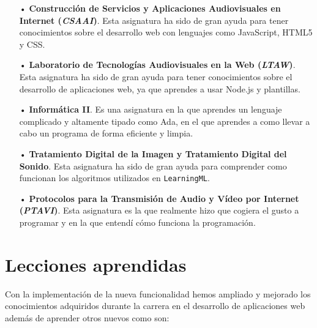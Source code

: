 \documentclass[a4paper, 12pt]{book}
\begin{document}
\begin{enumerate}
  \item[•] \textbf{Construcción de Servicios y Aplicaciones Audiovisuales en Internet (\emph{CSAAI})}. Esta asignatura ha sido de gran ayuda para tener conocimientos sobre el desarrollo web con lenguajes como JavaScript, HTML5 y CSS.
  
  \item[•] \textbf{Laboratorio de Tecnologías Audiovisuales en la Web (\emph{LTAW})}. Esta asignatura ha sido de gran ayuda para tener conocimientos sobre el desarrollo de aplicaciones web, ya que aprendes a usar Node.js y plantillas.
  
  \item[•] \textbf{Informática II}. Es una asignatura en la que aprendes un lenguaje complicado y altamente tipado como Ada, en el que aprendes a como llevar a cabo un programa de forma eficiente y limpia.
  
  \item[•] \textbf{Tratamiento Digital de la Imagen y Tratamiento Digital del Sonido}. Esta asignatura ha sido de gran ayuda para comprender como funcionan los algoritmos utilizados en \texttt{LearningML}.
  
  \item[•] \textbf{Protocolos para la Transmisión de Audio y Vídeo por Internet (\emph{PTAVI})}. Esta asignatura es la que realmente hizo que cogiera el gusto a programar y en la que entendí cómo funciona la programación.
  
\end{enumerate}


\section{Lecciones aprendidas}
\label{sec:lecciones_aprendidas}

Con la implementación de la nueva funcionalidad hemos ampliado y mejorado los conocimientos adquiridos durante la carrera en el desarrollo de aplicaciones web además de aprender otros nuevos como son:
\end{document}
